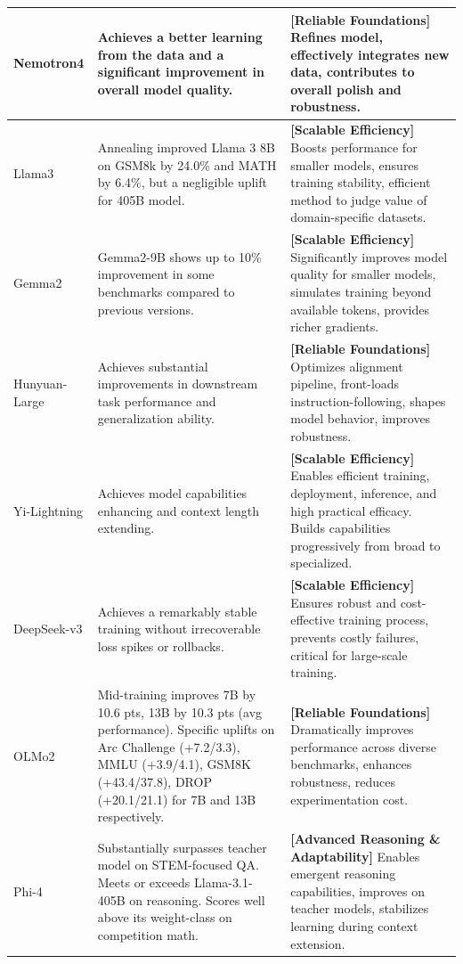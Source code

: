 \begin{table}[h]
\begin{tabular}{p{1.5cm}p{7.6cm}p{7.6cm}}
    \midrule
    Nemotron4     & Achieves a better learning from the data and a significant improvement in overall model quality. & \textbf{[Reliable Foundations]} Refines model, effectively integrates new data, contributes to overall polish and robustness. \\
    \midrule
    Llama3        & Annealing improved Llama 3 8B on GSM8k by 24.0\% and MATH by 6.4\%, but a negligible uplift for 405B model. & \textbf{[Scalable Efficiency]} Boosts performance for smaller models, ensures training stability, efficient method to judge value of domain-specific datasets. \\
    \midrule
    Gemma2        & Gemma2-9B shows up to 10\% improvement in some benchmarks compared to previous versions. & \textbf{[Scalable Efficiency]} Significantly improves model quality for smaller models, simulates training beyond available tokens, provides richer gradients. \\
    \midrule
    Hunyuan-Large & Achieves substantial improvements in downstream task performance and generalization ability. & \textbf{[Reliable Foundations]} Optimizes alignment pipeline, front-loads instruction-following, shapes model behavior, improves robustness. \\
    \midrule
    Yi-Lightning  & Achieves model capabilities enhancing and context length extending. & \textbf{[Scalable Efficiency]} Enables efficient training, deployment, inference, and high practical efficacy. Builds capabilities progressively from broad to specialized. \\
    \midrule
    DeepSeek-v3   & Achieves a remarkably stable training without irrecoverable loss spikes or rollbacks. & \textbf{[Scalable Efficiency]} Ensures robust and cost-effective training process, prevents costly failures, critical for large-scale training. \\
    \midrule
    OLMo2         & Mid-training improves 7B by 10.6 pts, 13B by 10.3 pts (avg performance). Specific uplifts on Arc Challenge (+7.2/3.3), MMLU (+3.9/4.1), GSM8K (+43.4/37.8), DROP (+20.1/21.1) for 7B and 13B respectively. & \textbf{[Reliable Foundations]} Dramatically improves performance across diverse benchmarks, enhances robustness, reduces experimentation cost. \\
    \midrule
    Phi-4         & Substantially surpasses teacher model on STEM-focused QA. Meets or exceeds Llama-3.1-405B on reasoning. Scores well above its weight-class on competition math. & \textbf{[Advanced Reasoning \& Adaptability]} Enables emergent reasoning capabilities, improves on teacher models, stabilizes learning during context extension. \\

\end{tabular}
\end{table}
